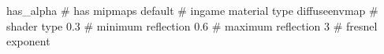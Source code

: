 has_alpha
# has mipmaps
default			 # ingame material type
diffuseenvmap            # shader type
0.3			 # minimum reflection
0.6			 # maximum reflection
3			 # fresnel exponent



